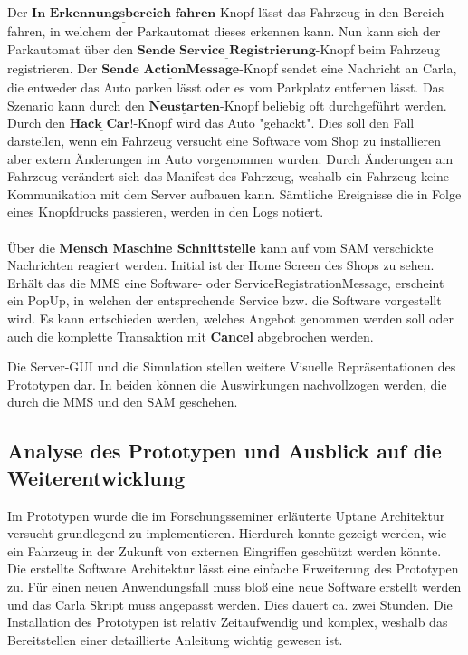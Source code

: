 Der $\underline{\textbf{In Erkennungsbereich fahren}}$-Knopf lässt das Fahrzeug in den Bereich fahren, in welchem der Parkautomat dieses erkennen kann. Nun kann sich der Parkautomat über den $\underline{\textbf{Sende Service Registrierung}}$-Knopf beim Fahrzeug registrieren. Der $\underline{\textbf{Sende ActionMessage}}$-Knopf sendet eine Nachricht an Carla, die entweder das Auto parken lässt oder es vom Parkplatz entfernen lässt. Das Szenario kann durch den $\underline{\textbf{Neustarten}}$-Knopf beliebig oft durchgeführt werden. Durch den $\underline{\textbf{Hack Car!}}$-Knopf wird das Auto "gehackt". Dies soll den Fall darstellen, wenn ein Fahrzeug versucht eine Software vom Shop zu installieren aber extern Änderungen im Auto vorgenommen wurden. Durch Änderungen am Fahrzeug verändert sich das Manifest des Fahrzeug, weshalb ein Fahrzeug keine Kommunikation mit dem Server aufbauen kann. Sämtliche Ereignisse die in Folge eines Knopfdrucks passieren, werden in den Logs notiert.\\\\
Über die \textbf{Mensch Maschine Schnittstelle} kann auf vom SAM verschickte Nachrichten reagiert werden. Initial ist der Home Screen des Shops zu sehen. Erhält das die MMS eine Software- oder ServiceRegistrationMessage, erscheint ein PopUp, in welchen der entsprechende Service bzw. die Software vorgestellt wird. Es kann entschieden werden, welches Angebot genommen werden soll oder auch die komplette Transaktion mit \textbf{Cancel} abgebrochen werden.

Die Server-GUI und die Simulation stellen weitere Visuelle Repräsentationen des Prototypen dar. In beiden können die Auswirkungen nachvollzogen werden, die durch die MMS und den SAM geschehen.

\subsection{Analyse des Prototypen und Ausblick auf die Weiterentwicklung}
Im Prototypen wurde die im Forschungsseminer erläuterte Uptane Architektur versucht grundlegend zu implementieren. Hierdurch konnte gezeigt werden, wie ein Fahrzeug in der Zukunft von externen Eingriffen geschützt werden könnte. Die erstellte Software Architektur lässt eine einfache Erweiterung des Prototypen zu. Für einen neuen Anwendungsfall muss bloß eine neue Software erstellt werden und das Carla Skript muss angepasst werden. Dies dauert ca. zwei Stunden. Die Installation des Prototypen ist relativ Zeitaufwendig und komplex, weshalb das Bereitstellen einer detaillierte Anleitung wichtig gewesen ist. \\

